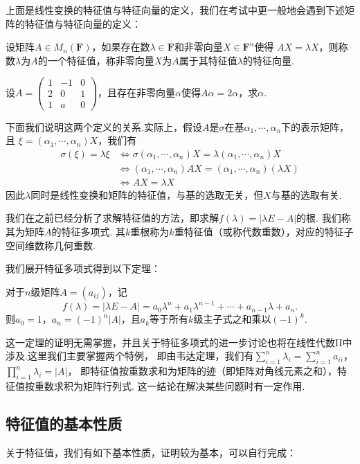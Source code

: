 上面是线性变换的特征值与特征向量的定义，我们在考试中更一般地会遇到下述矩阵的特征值与特征向量的定义：
\begin{definition}
	设矩阵$A\in M_n(\mathbf{F})$，如果存在数$\lambda\in\mathbf{F}$和非零向量$X\in\mathbf{F}^n$使得
	$AX=\lambda X$，则称数$\lambda$为$A$的一个特征值，称非零向量$X$为$A$属于其特征值$\lambda$的特征向量.
\end{definition}
\begin{example}
	设$A=\begin{pmatrix}
		1 & -1 & 0 \\ 2 & 0 & 1 \\ 1 & a & 0
	\end{pmatrix}$，且存在非零向量$\alpha$使得$A\alpha=2\alpha$，求$\alpha$.
\end{example}
下面我们说明这两个定义的关系.实际上，假设$A$是$\sigma$在基$\alpha_1,\cdots,\alpha_n$下的表示矩阵，且
$\xi=(\alpha_1,\cdots,\alpha_n)X$，我们有
\begin{align*}
	\sigma(\xi)=\lambda\xi &\Leftrightarrow \sigma(\alpha_1,\cdots,\alpha_n)X=\lambda(\alpha_1,\cdots,\alpha_n)X \\
						   &\Leftrightarrow (\alpha_1,\cdots,\alpha_n)AX=(\alpha_1,\cdots,\alpha_n)(\lambda X) \\
						   &\Leftrightarrow AX=\lambda X
\end{align*}
因此$\lambda$同时是线性变换和矩阵的特征值，与基的选取无关，但$X$与基的选取有关.

我们在之前已经分析了求解特征值的方法，即求解$f(\lambda)=|\lambda E-A|$的根. 我们称其为矩阵$A$的特征多项式.
其$k$重根称为$k$重特征值（或称代数重数），对应的特征子空间维数称几何重数.

我们展开特征多项式得到以下定理：
\begin{theorem}
	对于$n$级矩阵$A=(a_{ij})$，记
	$$f(\lambda)=|\lambda E-A|=a_0\lambda^n+a_1\lambda^{n-1}+\cdots+a_{n-1}\lambda+a_n.$$
	则$a_0=1$，$a_n=(-1)^n|A|$，且$a_k$等于所有$k$级主子式之和乘以$(-1)^k$.
\end{theorem}
这一定理的证明无需掌握，并且关于特征多项式的进一步讨论也将在线性代数II中涉及.这里我们主要掌握两个特例，
即由韦达定理，我们有$\sum\limits_{i=1}^{n}\lambda_i=\sum\limits_{i=1}^{n}a_{ii}$，
$\prod\limits_{i=1}^{n}\lambda_i=|A|$，
即特征值按重数求和为矩阵的迹（即矩阵对角线元素之和），特征值按重数求积为矩阵行列式.
这一结论在解决某些问题时有一定作用.

\subsection{特征值的基本性质}
关于特征值，我们有如下基本性质，证明较为基本，可以自行完成：

